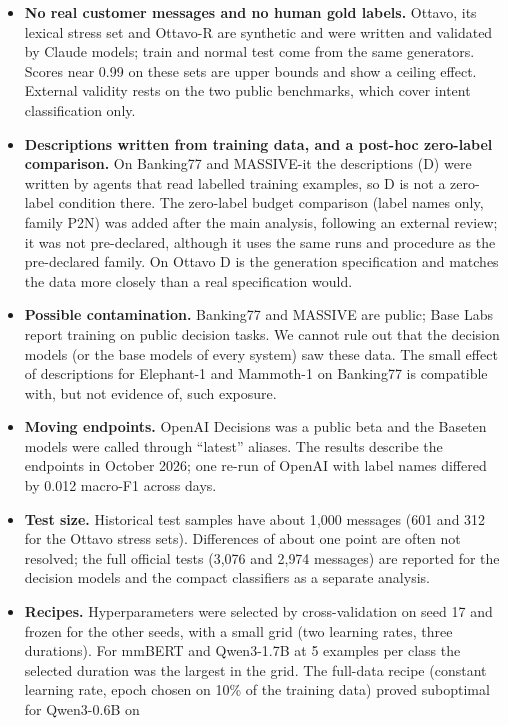 \begin{itemize}
\item \textbf{No real customer messages and no human gold labels.} Ottavo, its lexical stress set and Ottavo-R are synthetic and were
written and validated by Claude models; train and normal test come from the same generators. Scores near 0.99 on these sets are upper
bounds and show a ceiling effect. External validity rests on the two public benchmarks, which cover intent classification only.
\item \textbf{Descriptions written from training data, and a post-hoc zero-label comparison.} On Banking77 and MASSIVE-it the
descriptions (D) were written by agents that read labelled training examples, so D is not a zero-label condition there. The zero-label
budget comparison (label names only, family P2N) was added after the main analysis, following an external review; it was not
pre-declared, although it uses the same runs and procedure as the pre-declared family. On Ottavo D is the generation specification and
matches the data more closely than a real specification would.
\item \textbf{Possible contamination.} Banking77 and MASSIVE are public; Base Labs report training on public decision tasks. We cannot
rule out that the decision models (or the base models of every system) saw these data. The small effect of descriptions for Elephant-1
and Mammoth-1 on Banking77 is compatible with, but not evidence of, such exposure.
\item \textbf{Moving endpoints.} OpenAI Decisions was a public beta and the Baseten models were called through ``latest'' aliases. The
results describe the endpoints in October 2026; one re-run of OpenAI with label names differed by 0.012 macro-F1 across days.
\item \textbf{Test size.} Historical test samples have about 1{,}000 messages (601 and 312 for the Ottavo stress sets). Differences of
about one point are often not resolved; the full official tests (3{,}076 and 2{,}974 messages) are reported for the decision models and
the compact classifiers as a separate analysis.
\item \textbf{Recipes.} Hyperparameters were selected by cross-validation on seed 17 and frozen for the other seeds, with a small grid
(two learning rates, three durations). For mmBERT and Qwen3-1.7B at 5 examples per class the selected duration was the largest in the
grid. The full-data recipe (constant learning rate, epoch chosen on 10\% of the training data) proved suboptimal for Qwen3-0.6B on

\end{itemize}
